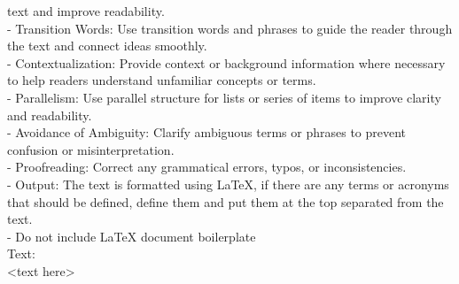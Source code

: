 text and improve readability. \\
- Transition Words: Use transition words and phrases to guide the reader through the text and connect ideas smoothly. \\
- Contextualization: Provide context or background information where necessary to help readers understand unfamiliar concepts or terms. \\
- Parallelism: Use parallel structure for lists or series of items to improve clarity and readability. \\
- Avoidance of Ambiguity: Clarify ambiguous terms or phrases to prevent confusion or misinterpretation. \\
- Proofreading: Correct any grammatical errors, typos, or inconsistencies. \\
- Output: The text is formatted using LaTeX, if there are any terms or acronyms that should be defined, define them and put them at the top separated from the text. \\
- Do not include LaTeX document boilerplate \\
Text: \\
<text here>
